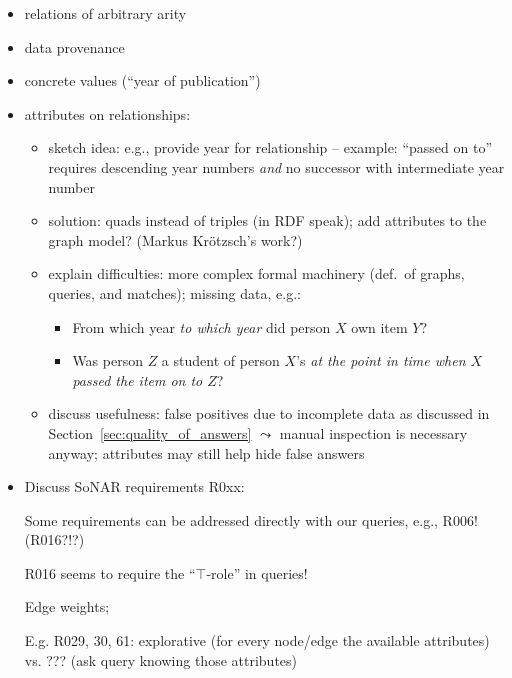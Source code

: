 %
\begin{itemize}
  \item
    relations of arbitrary arity
  \item
    data provenance
  \item
    concrete values (\enquote{year of publication})
  \item
    attributes on relationships:
    \begin{itemize}
      \item
        sketch idea: e.g., provide year for relationship  -- example: \enquote{passed on to} requires descending year numbers \emph{and} no successor with intermediate year number
      \item
        solution: quads instead of triples (in \gls{RDF} speak); add attributes to the graph model? (Markus Krötzsch's work?)
      \item
        explain difficulties: more complex formal machinery (def.\ of graphs, queries, and matches); missing data, e.g.:
        \begin{itemize}
          \item
            From which year \emph{to which year} did person $X$ own item $Y$?
          \item
            Was person $Z$ a student of person $X$'s \emph{at the point in time when $X$ passed the item on to $Z$}?
        \end{itemize}
      \item
        discuss usefulness: false positives due to incomplete data as discussed in Section~\ref{sec:quality_of_answers}
        $\leadsto$ manual inspection is necessary anyway; attributes may still help hide false answers
    \end{itemize}
  \item
    Discuss \gls{SoNAR} requirements R0xx:
    
    Some requirements can be addressed directly with our queries, e.g., R006! (R016?!?)

    R016 seems to require the \enquote{$\top$-role} in queries!

    Edge weights;

    E.g. R029, 30, 61: explorative (for every node/edge the available attributes) vs. ??? (ask query knowing those attributes)
    
\end{itemize}
